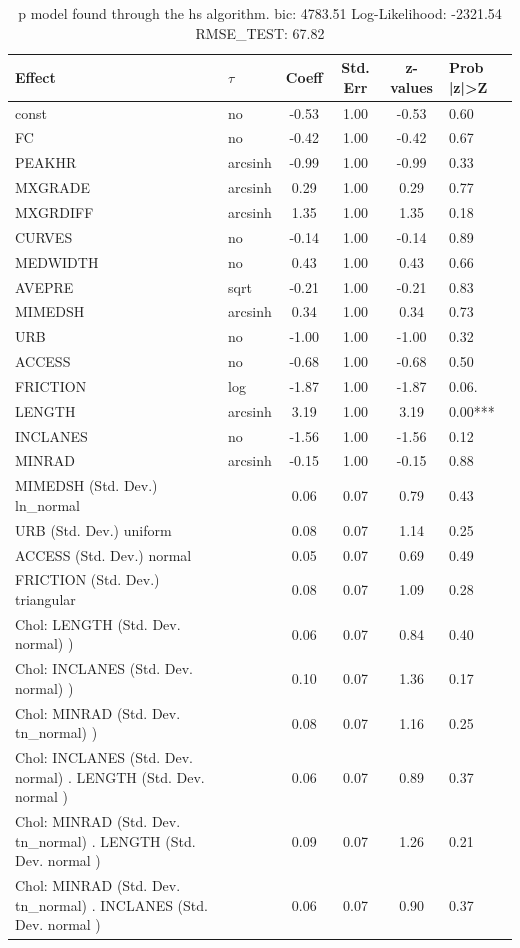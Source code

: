 \begin{table}
	\caption{p model found through the hs algorithm. bic: 4783.51 Log-Likelihood: -2321.54 RMSE_TEST: 67.82}
	\begin{center}
		\begin{tabular}{|l|l|c|c|c|l|}
			\hline
			Effect & $\tau$ & Coeff & Std. Err & z-values & Prob |z|>Z \\
			\hline
			const & no & -0.53 & 1.00 & -0.53 & 0.60 \\
			\hline
			FC & no & -0.42 & 1.00 & -0.42 & 0.67 \\
			\hline
			PEAKHR & arcsinh & -0.99 & 1.00 & -0.99 & 0.33 \\
			\hline
			MXGRADE & arcsinh & 0.29 & 1.00 & 0.29 & 0.77 \\
			\hline
			MXGRDIFF & arcsinh & 1.35 & 1.00 & 1.35 & 0.18 \\
			\hline
			CURVES & no & -0.14 & 1.00 & -0.14 & 0.89 \\
			\hline
			MEDWIDTH & no & 0.43 & 1.00 & 0.43 & 0.66 \\
			\hline
			AVEPRE & sqrt & -0.21 & 1.00 & -0.21 & 0.83 \\
			\hline
			MIMEDSH & arcsinh & 0.34 & 1.00 & 0.34 & 0.73 \\
			\hline
			URB & no & -1.00 & 1.00 & -1.00 & 0.32 \\
			\hline
			ACCESS & no & -0.68 & 1.00 & -0.68 & 0.50 \\
			\hline
			FRICTION & log & -1.87 & 1.00 & -1.87 & 0.06. \\
			\hline
			LENGTH & arcsinh & 3.19 & 1.00 & 3.19 & 0.00*** \\
			\hline
			INCLANES & no & -1.56 & 1.00 & -1.56 & 0.12 \\
			\hline
			MINRAD & arcsinh & -0.15 & 1.00 & -0.15 & 0.88 \\
			\hline
			MIMEDSH (Std. Dev.) ln_normal &  & 0.06 & 0.07 & 0.79 & 0.43 \\
			\hline
			URB (Std. Dev.) uniform &  & 0.08 & 0.07 & 1.14 & 0.25 \\
			\hline
			ACCESS (Std. Dev.) normal &  & 0.05 & 0.07 & 0.69 & 0.49 \\
			\hline
			FRICTION (Std. Dev.) triangular &  & 0.08 & 0.07 & 1.09 & 0.28 \\
			\hline
			 Chol: LENGTH (Std. Dev. normal) ) &  & 0.06 & 0.07 & 0.84 & 0.40 \\
			\hline
			 Chol: INCLANES (Std. Dev. normal) ) &  & 0.10 & 0.07 & 1.36 & 0.17 \\
			\hline
			 Chol: MINRAD (Std. Dev. tn_normal) ) &  & 0.08 & 0.07 & 1.16 & 0.25 \\
			\hline
			 Chol: INCLANES (Std. Dev. normal) . LENGTH (Std. Dev.   normal ) &  & 0.06 & 0.07 & 0.89 & 0.37 \\
			\hline
			 Chol: MINRAD (Std. Dev. tn_normal) . LENGTH (Std. Dev.   normal ) &  & 0.09 & 0.07 & 1.26 & 0.21 \\
			\hline
			 Chol: MINRAD (Std. Dev. tn_normal) . INCLANES (Std. Dev.   normal ) &  & 0.06 & 0.07 & 0.90 & 0.37 \\
			\hline
		\end{tabular}
	\end{center}
\end{table}